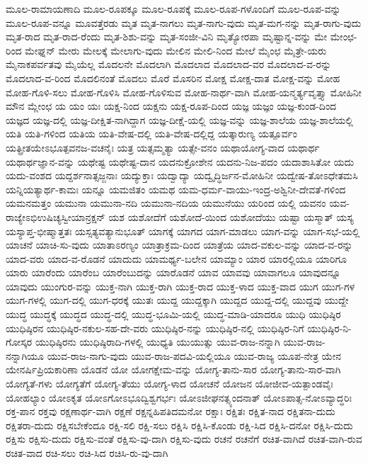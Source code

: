 {ಮೂಲ-ರಾಮಾಯಣಾದಿ
ಮೂಲ-ರೂಪಕ್ಕೂ
ಮೂಲ-ರೂಪಕ್ಕೆ
ಮೂಲ-ರೂಪ-ಗಳೊಂದಿಗೆ
ಮೂಲ-ರೂಪ-ವನ್ನು
ಮೂಲ-ರೂಪ-ವನ್ನೂ
ಮೂವತ್ತೆರಡು
ಮೃತ
ಮೃತ-ನಾಗಲು
ಮೃತ-ನಾಗು-ವುದು
ಮೃತ-ಮಗ-ನನ್ನು
ಮೃತ-ರಾಗು-ವುದು
ಮೃತ-ರಾದ
ಮೃತ-ರಾದ-ರೆಂದು
ಮೃತ-ಶಿಶು-ವನ್ನು
ಮೃತ-ಸಂಜೀ-ವಿನಿ
ಮೃತ್ಯೋರಪಾ
ಮೃಷ್ಟಾನ್ನ-ವನ್ನು
ಮೇ
ಮೇಂಛ-ರಿಂದ
ಮೇಘ್ನನ್
ಮೇರು
ಮೇಲಕ್ಕೆ
ಮೇಲಾಗು-ವುದು
ಮೇಲಿನ
ಮೇಲಿ-ನಿಂದ
ಮೇಲೆ
ಮೈಂಛ
ಮೈತ್ರೇ-ಯರು
ಮೈನಾಕಪರ್ವತವು
ಮೈಯೆಲ್ಲ
ಮೊದಲನೇ
ಮೊದಲಾಗಿ
ಮೊದಲಾದ
ಮೊದಲಾದ-ವರ
ಮೊದಲಾದ-ವ-ರನ್ನು
ಮೊದಲಾದ-ವ-ರಿಂದ
ಮೊದಲಿನಂತೆ
ಮೊದಲು
ಮೊರೆ
ಮೊಸರಿನ
ಮೋಕ್ಷ
ಮೋಕ್ಷ-ದಾತ
ಮೋಕ್ಷ-ವನ್ನು
ಮೋಹ
ಮೋಹ-ಗೊಳಿ-ಸಲು
ಮೋಹ-ಗೊಳಿಸಿ
ಮೋಹ-ಗೊಳಿಸುವ
ಮೋಹ-ನಾರ್ಥ-ವಾಗಿ
ಮೋಹ-ಯನ್ಮರ್ತ್ಯವೃತ್ತ್ಯಾ
ಮೋಹಿನೀ
ಮೌನ
ಮ್ಲೇಂಛ
ಯ
ಯಂ
ಯಃ
ಯಕ್ಷ-ನಿಂದ
ಯಕ್ಷನು
ಯಕ್ಷ-ರೂಪ-ದಿಂದ
ಯಜ್ಞ
ಯಜ್ಞಂ
ಯಜ್ಞ-ಕುಂಡ-ದಿಂದ
ಯಜ್ಞದ
ಯಜ್ಞ-ದಲ್ಲಿ
ಯಜ್ಞ-ದೀಕ್ಷಿತ-ನಾಗಿದ್ದಾಗ
ಯಜ್ಞ-ದೀಕ್ಷೆ-ಯಲ್ಲಿ
ಯಜ್ಞ-ವನ್ನು
ಯಜ್ಞ-ಶಾಲೆಯ
ಯಜ್ಞ-ಶಾಲೆಯಲ್ಲಿ
ಯತಿ
ಯತಿ-ಗಳಿಂದ
ಯತಿಯ
ಯತಿ-ವೇಷ-ದಲ್ಲಿ
ಯತಿ-ವೇಷ-ದಲ್ಲಿದ್ದ
ಯತ್ಕಾರುಣ್ಯ
ಯತ್ಪೂರ್ವಂ
ಯತ್ಪ್ರೀತಯೇಽಭೂತ್ಪವನಜ-ವಚನೈಃ
ಯತ್ರ
ಯತ್ಸಮ್ಮತ್ಯಾ
ಯತ್ಸೇ-ವನಂ
ಯಥಾಯೋಗ್ಯ-ವಾದ
ಯಥಾರ್ಥ
ಯಥಾರ್ಥಜ್ಞಾನ-ವನ್ನು
ಯಥೇಷ್ಟ
ಯಥೇಷ್ಟ-ದಾನ
ಯದನುಕ್ರೋಶೇನ
ಯದನು-ನಿಜ-ಪದಂ
ಯದಾಶಾಸಿತೋ
ಯದು
ಯದು-ವಂಶದ
ಯದ್ದರ್ಶನಾತ್ಸಜ್ಜನಾಃ
ಯದ್ಯುಕ್ತಾಃ
ಯದ್ವಾದ್ಯಾ
ಯದ್ವೃದ್ಧಿರ್ಜನ-ಮೋಹಿನೀ
ಯದ್ವೇಷ-ತೋಽಧೇತಮಸಿ
ಯನ್ನಿಯತ್ಯಾರ್ಥ-ಕಾಮಃ
ಯನ್ನೂ
ಯಮಜಿತಂ
ಯಮಥ
ಯಮ-ಧರ್ಮ-ವಾಯು-ಇಂದ್ರ-ಅಶ್ವಿನೀ-ದೇವತೆ-ಗಳಿಂದ
ಯಮನಮತ್ತಂ
ಯಮುನಾ
ಯಮುನಾ-ನದಿ
ಯಮುನಾ-ನದಿಯ
ಯಮುನೆಯು
ಯರಿಂದ
ಯಲ್ಲಿ
ಯವನಂ
ಯವ-ರಾಜ್ಯೇಽಭಿಉಷಿಚ್ಯಸ್ವೀಯಾನ್ರಕ್ಷನ್
ಯಶ
ಯಶೋದೆಗೆ
ಯಶೋದೆ-ಯಿಂದ
ಯಶೋದೆಯು
ಯಷ್ಟಾ
ಯಸ್ಮಾತ್
ಯಸ್ಯ
ಯಸ್ಯಾಪ್ತ-ಭೀಷ್ಮಾತ್ತತಃ
ಯಸ್ಸತ್ಯವತ್ಯಾನುಭೂತ್
ಯಾಗಕ್ಕೆ
ಯಾಗದ
ಯಾಗ-ಮಾಡಲು
ಯಾಗ-ವನ್ನು
ಯಾಗ-ಸಭೆ-ಯಲ್ಲಿ
ಯಾಚನೆ
ಯಾಚಿ-ಸು-ವುದು
ಯಾತಾಽರಣ್ಯಂ
ಯಾತ್ರಾಕ್ರಮ-ದಿಂದ
ಯಾತ್ರೆಯ
ಯಾದ-ವಕುಲ-ವನ್ನು
ಯಾದ-ವ-ರನ್ನು
ಯಾದ-ವರು
ಯಾದ-ವ-ರೊಡನೆ
ಯಾದುದು
ಯಾಮರ್ಥ್ಯ-ಬಲೇನ
ಯಾಮ್ಯಾಂ
ಯಾರ
ಯಾರಲ್ಲಿಯೂ
ಯಾರಿಗೂ
ಯಾರು
ಯಾರೆಂದು
ಯಾರೆಂಬ
ಯಾರೆಂಬುದನ್ನು
ಯಾರೊಡನೆ
ಯಾವ
ಯಾವವು
ಯಾವಾಗಲೂ
ಯಾವುದನ್ನೂ
ಯಾವುದು
ಯುಂಗುರ-ವನ್ನು
ಯುಕ್ತ-ನಾಗಿ
ಯುಕ್ತ-ರಾಗಿ
ಯುಕ್ತ-ರಾದ
ಯುಕ್ತ-ಳಾದ
ಯುಕ್ತ-ವಾದ
ಯುಗ
ಯುಗ-ಗಳ
ಯುಗ-ಗಳಲ್ಲಿ
ಯುಗ-ದಲ್ಲಿ
ಯುಗ-ಧರಕ್ಕೆ
ಯುತಃ
ಯುದ್ದ
ಯುದ್ದಕ್ಕಾಗಿ
ಯುದ್ದದ
ಯುದ್ದ-ದಲ್ಲಿ
ಯುದ್ದವು
ಯುದ್ದೇ
ಯುದ್ಧ
ಯುದ್ಧಕ್ಕೆ
ಯುದ್ಧದ
ಯುದ್ಧ-ದಲ್ಲಿ
ಯುದ್ಧ-ಭೂಮಿ-ಯಲ್ಲಿ
ಯುದ್ಧ-ಮಾಡಿ-ಯಾದರೂ
ಯುಧಿ
ಯುಧಿಷ್ಠಿರ
ಯುಧಿಷ್ಠಿರನ
ಯುಧಿಷ್ಠಿರ-ನಕುಲ-ಸಹ-ದೇ-ವರು
ಯುಧಿಷ್ಠಿರ-ನನ್ನು
ಯುಧಿಷ್ಠಿರ-ನಲ್ಲಿ
ಯುಧಿಷ್ಠಿರ-ನಿಗೆ
ಯುಧಿಷ್ಠಿರ-ನಿ-ಗೋಸ್ಕರ
ಯುಧಿಷ್ಠಿರನು
ಯುಧಿಷ್ಠಿರಾದಿ-ಗಳಲ್ಲಿ
ಯುಧ್ಯತಿ
ಯುಯುತ್ಸು
ಯುವ-ರಾಜ-ನನ್ನಾಗಿ
ಯುವ-ರಾಜ-ನನ್ನಾಗಿಯೂ
ಯುವ-ರಾಜ-ನಾಗು-ವುದು
ಯುವ-ರಾಜ-ಪದವಿ-ಯಲ್ಲಿಯೂ
ಯುವ-ರಾಜ್ಯ
ಯೂಪ-ನೇತ್ರ
ಯೇನ
ಯೇನರ್ಷಿಪ್ರಿಯಕಾರಿಣಾ
ಯೊಡನೆ
ಯೋ
ಯೋಗಕ್ಷೇಮ-ವನ್ನು
ಯೋಗ್ಯ-ತಾನು-ಸಾರ
ಯೋಗ್ಯ-ತಾನು-ಸಾರ-ವಾಗಿ
ಯೋಗ್ಯತೆ-ಗಳು
ಯೋಗ್ಯತೆಗೆ
ಯೋಗ್ಯ-ತೆಯು
ಯೋಗ್ಯ-ಳಾದ
ಯೋಚನೆ
ಯೋಜನ
ಯೋಜೀವ-ಯತ್ಪಾಂಡವೈಃ
ಯೋಹಲ್ಯಾಂ
ಯೋಽಕೃತ
ಯೋಽಗೋಽಭೂದ್ವಿಶ್ವಗರ್ಭಃ
ಯೋಽಜೀಘನತ್ಸ್ಯಂದನಾತ್
ಯೋಽಪಾತ್ಸ-ನೋಽವ್ಯಾದ್ಧರಿಃ
ರಕ್ತ-ಪಾನ
ರಕ್ತವು
ರಕ್ಷಣಾರ್ಥ-ವಾಗಿ
ರಕ್ಷಣೆ
ರಕ್ಷನ್ನಹಿಪತಿದಮನೋ
ರಕ್ಷಾಃ
ರಕ್ಷಿತಃ
ರಕ್ಷಿತ-ನಾದ
ರಕ್ಷಿತನಾ-ದುದು
ರಕ್ಷಿತರಾ-ದುದು
ರಕ್ಷಿಸಬೇಕೆಂದೂ
ರಕ್ಷಿ-ಸಲಿ
ರಕ್ಷಿ-ಸಲು
ರಕ್ಷಿಸಿ
ರಕ್ಷಿಸಿ-ಕೊಂಡು
ರಕ್ಷಿ-ಸಿದ
ರಕ್ಷಿಸಿ-ದನೋ
ರಕ್ಷಿಸಿ-ದುದು
ರಕ್ಷಿಸು
ರಕ್ಷಿಸು-ದುದು
ರಕ್ಷಿಸು-ವಂತೆ
ರಕ್ಷಿಸು-ವು-ದಾಗಿ
ರಕ್ಷಿಸು-ವುದು
ರಚನೆ
ರಚನೆಗೆ
ರಚಿತ-ವಾಗಿದೆ
ರಚಿತ-ವಾಗಿ-ರುವ
ರಚಿತ-ವಾದ
ರಚಿ-ಸಲು
ರಚಿ-ಸಿದ
ರಚಿಸಿ-ರು-ವು-ದಾಗಿ
}
